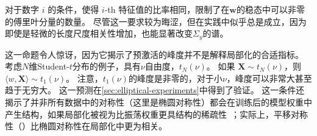 对于数字 $i$ 的条件，使得 $i$-th 特征值的比率相同，限制了在$\mathbf{w}$的稳态中可以非零的傅里叶分量的数量。
尽管这一要求较为晦涩，但在实践中似乎总是成立，因为即使是轻微的长度尺度相关性增加，也能显著改变$\Sigma_y$的谱。

这一命题令人惊讶，因为它揭示了预激活的峰度并不是解释局部化的合适指标。
考虑$N$维Student-$t$分布的例子，具有$\nu$自由度，$t_N(\nu)$。
如果 $\mathbf{X} \sim t_N(\nu)$，则 $\langle w, \mathbf{X} \rangle \sim t_1(\nu)$。
注意，$t_1(\nu)$的峰度是非零的，对于小$\nu$，峰度可以非常大甚至趋于无穷大。
这一预测在\cref{sec:elliptical-experiments}中得到了验证。
这一条件还揭示了并非所有数据中的对称性（这里是椭圆对称性）都会在训练后的模型权重中产生结构，如果局部化被视为比振荡权重更具结构的稀疏性~\parencite[\cf][]{godfrey2023symmetries}；实际上，平移对称性（）比椭圆对称性在局部化中更为相关。
